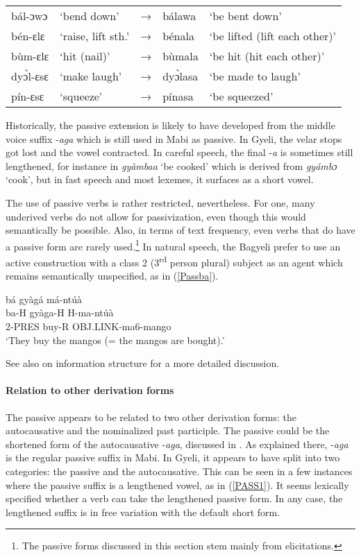 \begin{exe} \ex \label{passive1b}
\begin{tabular}{lllll}
bál-ɔwɔ & `bend down' & → & bálawa & `be bent down' \\
bén-ɛlɛ& `raise, lift sth.' & → & bénala & `be lifted (lift each other)' \\
bùm-ɛlɛ & `hit (nail)' & → & bùmala & `be hit (hit each other)' \\
dyɔ̀l-ɛsɛ & `make laugh' & → & dyɔ̀lasa & `be made to laugh' \\
pín-ɛsɛ & `squeeze' & → & pínasa & `be squeezed' \\
\end{tabular}
\end{exe} 

Historically, the passive extension is likely to have developed from the middle voice suffix -{\itshape aga} which is still used in Mabi as passive. In Gyeli, the velar stops got lost and the vowel contracted. In careful speech, the final -{\itshape a} is sometimes still lengthened, for instance in {\itshape gyàmbaa} `be cooked' which is derived from {\itshape gyámbɔ} `cook',  but in fast speech and most lexemes, it surfaces as a short vowel.

The use of passive verbs is rather restricted, nevertheless. For one, many underived verbs do not allow for passivization, even though this would semantically be possible. Also, in terms of text frequency, even verbs that do have a passive form are rarely used.\footnote{The passive forms discussed in this section stem mainly from elicitations.} In natural speech, the Bagyeli prefer to use an active construction with a class 2 (3\textsuperscript{rd} person plural) subject as an agent which remains semantically unspecified, as in (\ref{Passba}).

\begin{exe}
\ex\label{Passba}
 \glll bá gyàgá má-ntúà  \\
	ba-H gyàga-H H-ma-ntúà \\
         2-PRES buy-R OBJ.LINK-ma6-mango  \\
    \trans `They buy the mangos (= the mangos are bought).'
\end {exe}

\noindent See also  on information structure for a more detailed discussion.


\paragraph{Relation to other derivation forms} The passive appears to be related to two other derivation forms: the autocausative and the nominalized past participle. The passive could be the shortened form of the autocausative -{\itshape aga}, discussed in . As explained there, -{\itshape aga} is the regular passive suffix in Mabi. In Gyeli, it appears to have split into two categories: the passive and the autocausative. This can be seen in a few instances where the passive suffix is a lengthened vowel, as in (\ref{PASS1}). It seems lexically specified whether a verb can take the lengthened passive form. In any case, the lengthened suffix is in free variation with the default short form.

